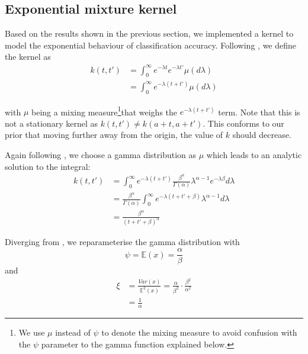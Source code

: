 \documentclass[a4paper,12pt,twoside,openright]{report}
\begin{document}








\subsection{Exponential mixture kernel}
Based on the results shown in the previous section, we implemented a kernel to model the exponential behaviour of classification accuracy. Following \cite{2014arXiv1406.3896S}, we define the kernel as
\begin{align}
k(t,t') &= \int_{0}^{\infty} e^{-\lambda t}e^{-\lambda t'}\mu(d\lambda)\\
&= \int_{0}^{\infty} e^{-\lambda(t+t')}\mu(d\lambda)
\end{align}

with $\mu$ being a mixing measure\footnote{We use $\mu$ instead of $\psi$ to denote the mixing measure to avoid confusion with the $\psi$ parameter to the gamma function explained below.}that weighs the $e^{-\lambda(t+t')}$ term. Note that this is not a stationary kernel as $k(t, t') \neq k(a + t, a + t')$. This conforms to our prior that moving further away from the origin, the value of $k$ should decrease.

Again following \cite{2014arXiv1406.3896S}, we choose a gamma distribution as $\mu$ which leads to an analytic solution to the integral:
\begin{align}
k(t, t') &= \int_0^{\infty} e^{-\lambda(t+t')}\frac{\beta^\alpha}{\Gamma(\alpha)}\lambda^{\alpha -1}e^{-\lambda\beta} d\lambda\\
&=\frac{\beta^\alpha}{\Gamma(\alpha)}\int_0^\infty e^{-\lambda(t+t'+\beta)}\lambda^{\alpha-1}d\lambda\\
&=\frac{\beta^\alpha}{(t+t'+\beta)^\alpha}
\end{align}

Diverging from \cite{2014arXiv1406.3896S}, we reparameterise the gamma distribution with
\begin{equation}
\psi = \mathbb{E}(x) = \frac{\alpha}{\beta}
\end{equation}
and
\begin{align}
\xi &= \frac{Var(x)}{\mathbb{E}^2 (x)} = \frac{\alpha}{\beta^2} \cdot \frac{\beta^2}{\alpha^2}\\
&= \frac{1}{\alpha}
\end{align}
\end{document}
